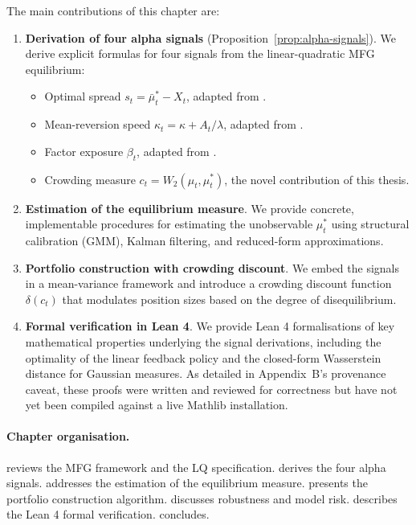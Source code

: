 The main contributions of this chapter are:

\begin{enumerate}
    \item \textbf{Derivation of four alpha signals} (Proposition~\ref{prop:alpha-signals}).
    We derive explicit formulas for four signals from the linear-quadratic MFG
    equilibrium:
    \begin{itemize}
        \item Optimal spread $s_t = \bar\mu_t^* - X_t$, adapted from \citep{cardaliaguetlehalle2018}.
        \item Mean-reversion speed $\kappa_t = \kappa + A_t/\lambda$, adapted from
        \citep{lehallemouzouni2019}.
        \item Factor exposure $\beta_t$, adapted from \citep{lehallemouzouni2019}.
        \item Crowding measure $c_t = W_2(\mu_t, \mu_t^*)$, the novel contribution of
        this thesis.
    \end{itemize}
    \item \textbf{Estimation of the equilibrium measure}. We provide concrete,
    implementable procedures for estimating the unobservable $\mu_t^*$ using
    structural calibration (GMM), Kalman filtering, and reduced-form approximations.
    \item \textbf{Portfolio construction with crowding discount}. We embed the
    signals in a mean-variance framework and introduce a crowding discount function
    $\delta(c_t)$ that modulates position sizes based on the degree of
    disequilibrium.
    \item \textbf{Formal verification in Lean 4}. We provide Lean 4 formalisations
    of key mathematical properties underlying the signal derivations, including the
    optimality of the linear feedback policy and the closed-form Wasserstein
    distance for Gaussian measures. As detailed in Appendix~B's provenance caveat,
    these proofs were written and reviewed for correctness but have not yet been
    compiled against a live Mathlib installation.
\end{enumerate}

\paragraph{Chapter organisation.}  reviews the
MFG framework and the LQ specification.  derives
the four alpha signals.  addresses the estimation of the
equilibrium measure.  presents the portfolio construction
algorithm.  discusses robustness and model risk.
 describes the Lean 4 formal verification.
 concludes.


